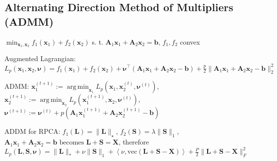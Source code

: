 \documentclass[a4paper, 11pt, landscape]{article}
\DeclareMathOperator*{\argmin}{arg\,min}
\begin{document}
\begin{multicols*}{3}
\subsection{Alternating Direction Method of Multipliers (ADMM)}
$\min_{\mathbf{x}_1, \mathbf{x}_2} f_1(\mathbf{x}_1) + f_2(\mathbf{x}_2)$ s. t. $\mathbf{A}_1 \mathbf{x}_1 + \mathbf{A}_2 \mathbf{x}_2 = \mathbf{b}$, $f_1, f_2$ convex
\begin{inparaitem}[\color{red}\textbullet]
	\item Augmented Lagrangian: $L_p(\mathbf{x}_1, \mathbf{x}_2, \boldsymbol{\nu}) = f_1(\mathbf{x}_1) + f_2(\mathbf{x}_2) + \boldsymbol{\nu}^\top (\mathbf{A}_1 \mathbf{x}_1 + \mathbf{A}_2 \mathbf{x}_2 - \mathbf{b}) + \frac{p}{2}\| \mathbf{A}_1 \mathbf{x}_1 + \mathbf{A}_2 \mathbf{x}_2 - \mathbf{b} \|_2^2$
	\item ADMM: $\mathbf{x}_1^{(t+1)} := \argmin_{\mathbf{x}_1} L_p(\mathbf{x}_1, \mathbf{x}_2^{(t)}, \boldsymbol{\nu}^{(t)})$, $\mathbf{x}_2^{(t+1)} := \argmin_{\mathbf{x}_2} L_p(\mathbf{x}_1^{(t+1)}, \mathbf{x}_2, \boldsymbol{\nu}^{(t)})$, $\boldsymbol{\nu}^{(t+1)} := \boldsymbol{\nu}^{(t)} + p(\mathbf{A}_1 \mathbf{x}_1^{(t+1)} + \mathbf{A}_2 \mathbf{x}_2^{(t+1)} - \mathbf{b})$
  \item ADDM for RPCA: $f_1(\mathbf{L}) = \|\mathbf{L}\|_\star$, $f_2(\mathbf{S}) = \lambda \| \mathbf{S} \|_1$, $\mathbf{A}_1 \mathbf{x}_1 + \mathbf{A}_2 \mathbf{x}_2 = \mathbf{b} \text{ becomes } \mathbf{L} + \mathbf{S} = \mathbf{X}$, therefore $L_p(\mathbf{L}, \mathbf{S}, \boldsymbol{\nu}) = \|\mathbf{L}\|_* + \nu \|\mathbf{S}\|_1 + \left< \nu, \mathrm{vec}(\mathbf{L}+\mathbf{S}-\mathbf{X}) \right> + \frac{P}{2} \| \mathbf{L}+ \mathbf{S} - \mathbf{X} \|_F^2$
\end{inparaitem}

\raggedcolumns
\end{multicols*}
\end{document}

